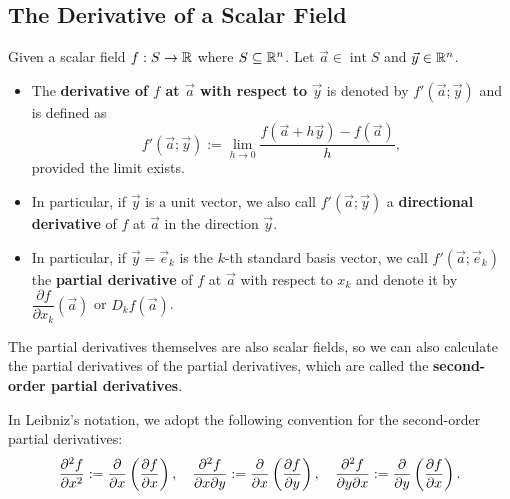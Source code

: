 \documentclass[a4paper]{ctexart}
\begin{document}
    \subsection{The Derivative of a Scalar Field}
    \begin{mydef}
        Given a scalar field $f:S\to \mathbb{R}$ where $S\subseteq \mathbb{R}^n$. Let $\vec a \in \operatorname{int} S$ and $\vec y \in \mathbb{R}^n$.
        \begin{itemize}
            \item The \textbf{derivative of $f$ at $\vec a$ with respect to $\vec y$} is denoted by $f'(\vec a; \vec y)$ and is defined as
            $$ f'(\vec a; \vec y) := \lim_{h\to 0} \frac{f(\vec a + h \vec y) - f(\vec a)}{h}, $$
            provided the limit exists.
            \item In particular, if $\vec y$ is a unit vector, we also call $f'(\vec a; \vec y)$ a \textbf{directional derivative} of $f$ at $\vec a$ in the direction $\vec y$.
            \item In particular, if $\vec y = \vec e_k$ is the $k$-th standard basis vector, we call $f'(\vec a; \vec e_k)$ the \textbf{partial derivative} of $f$ at $\vec a$ with respect to $x_k$ and denote it by $\dfrac{\partial f}{\partial x_k}(\vec a)$ or $D_k f(\vec a)$.
        \end{itemize}
    \end{mydef}
    \begin{myrmk}
        The partial derivatives themselves are also scalar fields, so we can also calculate the partial derivatives of the partial derivatives, which are called the \textbf{second-order partial derivatives}.
    \end{myrmk}
    \begin{mynot}
        In Leibniz's notation, we adopt the following convention for the second-order partial derivatives:
        $$ \frac{\partial^2 f}{\partial x ^2} := \pdv{x}\left( \pdv{f}{x} \right), \quad \frac{\partial^2 f}{\partial x \partial y} := \pdv{x}\left( \pdv{f}{y} \right), \quad \frac{\partial^2 f}{\partial y \partial x} := \pdv{y}\left( \pdv{f}{x} \right).$$
    \end{mynot}
\end{document}
